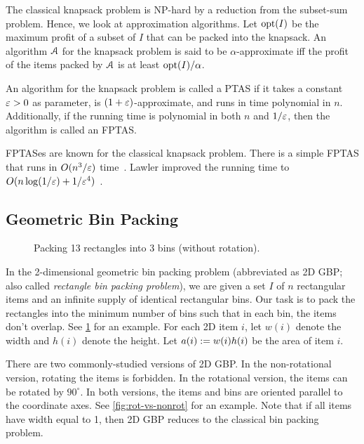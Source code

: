 The classical knapsack problem is NP-hard by a reduction from the subset-sum problem.
Hence, we look at approximation algorithms.
Let $\operatorname{opt}(I)$ be the maximum profit of a subset of $I$ that can be packed into the knapsack.
An algorithm $\mathcal{A}$ for the knapsack problem is said to be $\alpha$-approximate iff
the profit of the items packed by $\mathcal{A}$ is at least $\operatorname{opt}(I)/\alpha$.

An algorithm for the knapsack problem is called a PTAS
if it takes a constant $\varepsilon > 0$ as parameter,
is $(1+\varepsilon)$-approximate, and runs in time polynomial in $n$.
Additionally, if the running time is polynomial in both $n$ and $1/\varepsilon$,
then the algorithm is called an FPTAS.

FPTASes are known for the classical knapsack problem.
There is a simple FPTAS that runs in $O(n^3/\varepsilon)$ time~\cite{daa:rounding-dp}.
Lawler improved the running time to $O(n\log(1/\varepsilon) + 1/\varepsilon^4)$~\cite{lawler1979fast}.

\subsection{Geometric Bin Packing}

\begin{figure}[htb]
\centering

\caption{Packing 13 rectangles into 3 bins (without rotation).}
\label{fig:2gbp}
\end{figure}

In the 2-dimensional geometric bin packing problem
(abbreviated as 2D GBP; also called \emph{rectangle bin packing problem}),
we are given a set $I$ of $n$ rectangular items and an infinite supply
of identical rectangular bins.
Our task is to pack the rectangles into the minimum number of bins such that
in each bin, the items don't overlap.
See \cref{fig:2gbp} for an example.
For each 2D item $i$, let $w(i)$ denote the width and $h(i)$ denote the height.
Let $a(i) := w(i)h(i)$ be the area of item $i$.

There are two commonly-studied versions of 2D GBP.
In the non-rotational version, rotating the items is forbidden.
In the rotational version, the items can be rotated by $90^{\circ}$.
In both versions, the items and bins are oriented parallel to the coordinate axes.
See \cref{fig:rot-vs-nonrot} for an example.
Note that if all items have width equal to 1, then 2D GBP reduces to
the classical bin packing problem.

